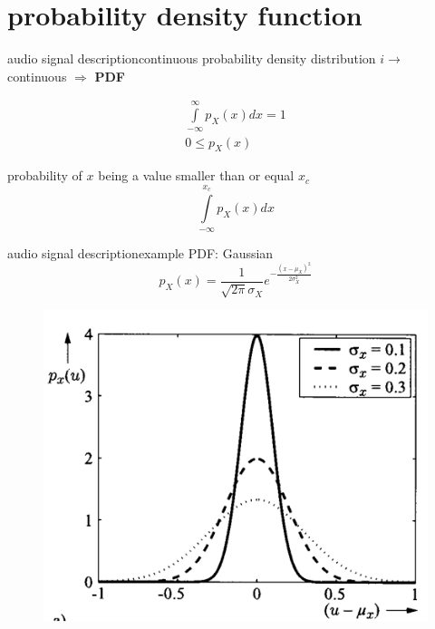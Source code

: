 \section{probability density function}
\begin{frame}{audio signal description}{continuous probability density distribution}
	$i\rightarrow$ continuous $\Rightarrow$ \textbf{PDF} 

	\pause
	\begin{eqnarray*}
		\int\limits_{-\infty}^{\infty} p_X(x)dx = 1\\
		0 \leq p_X(x)
	\end{eqnarray*}		

	\pause
	probability of $x$ being a value smaller than or equal $x_c$
				\begin{equation*}
					\int\limits_{-\infty}^{x_c} p_X(x)dx
				\end{equation*}		
\end{frame}	
	
\begin{frame}{audio signal description}{example PDF: Gaussian}
    \vspace{-5mm}
	\begin{equation*} \label{gaussverteilung}
		p_X(x)= \frac{1}{\sqrt{2\pi}\sigma_X}e^{-\frac{(x-\mu_X)^2}{2\sigma_X^2}}
	\end{equation*}
	\begin{figure}
		\centering
			\includegraphics[scale=.5]{graph/gaussdist}
	\end{figure}
\end{frame}	

